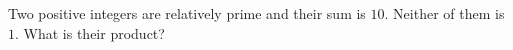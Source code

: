 Two positive integers are relatively prime and their sum is $10$. Neither of them is $1$. What is their product?

